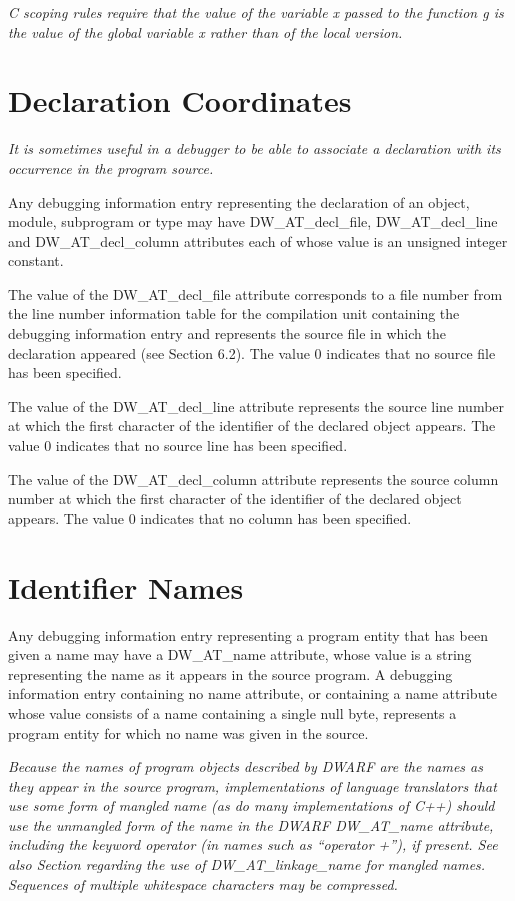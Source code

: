 \textit{C scoping rules require that the 
value of the variable x passed to the function g is the value of the
global variable x rather than of the local version.}


\section{Declaration Coordinates}
\label{chap:declarationcoordinates}
\textit{It is sometimes useful in a debugger to be able to associate
a declaration with its occurrence in the program source.
}

Any debugging information entry representing the
declaration of an object, module, subprogram or type may have
DW\-\_AT\-\_decl\-\_file, DW\-\_AT\-\_decl\-\_line and DW\-\_AT\-\_decl\-\_column
attributes each of whose value is an unsigned integer constant.

The value of the DW\-\_AT\-\_decl\-\_file attribute corresponds to
a file number from the line number information table for the
compilation unit containing the debugging information entry and
represents the source file in which the declaration appeared
(see Section 6.2). The value 0 indicates that no source file
has been specified.

The value of the DW\-\_AT\-\_decl\-\_line attribute represents
the source line number at which the first character of
the identifier of the declared object appears. The value 0
indicates that no source line has been specified.

The value of the DW\-\_AT\-\_decl\-\_column attribute represents
the source column number at which the first character of
the identifier of the declared object appears. The value 0
indicates that no column has been specified.

\section{Identifier Names}
\label{chap:identifiernames}
Any debugging information entry representing a program entity
that has been given a name may have a DW\-\_AT\-\_name attribute,
whose value is a string representing the name as it appears in
the source program. A debugging information entry containing
no name attribute, or containing a name attribute whose value
consists of a name containing a single null byte, represents
a program entity for which no name was given in the source.

\textit{Because the names of program objects described by DWARF are the
names as they appear in the source program, implementations
of language translators that use some form of mangled name
(as do many implementations of C++) should use the unmangled
form of the name in the DWARF DW\-\_AT\-\_name attribute,
including the keyword operator (in names such as “operator
+”), if present. See also 
Section  regarding the use
of DW\-\_AT\-\_linkage\-\_name for mangled names. Sequences of
multiple whitespace characters may be compressed.}

